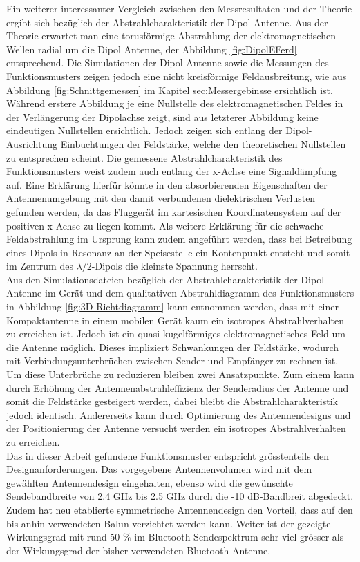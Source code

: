 Ein weiterer interessanter Vergleich zwischen den Messresultaten und der Theorie ergibt sich bezüglich der Abstrahlcharakteristik der Dipol Antenne. Aus der Theorie erwartet man eine torusförmige Abstrahlung der elektromagnetischen Wellen radial um die Dipol Antenne, der Abbildung \ref{fig:DipolEFerd} entsprechend. Die Simulationen der Dipol Antenne sowie die Messungen des Funktionsmusters zeigen jedoch eine nicht kreisförmige Feldausbreitung, wie aus Abbildung \ref{fig:Schnittgemessen} im Kapitel {sec:Messergebinsse} ersichtlich ist. Während erstere Abbildung je eine Nullstelle des elektromagnetischen Feldes in der Verlängerung der Dipolachse zeigt, sind aus letzterer Abbildung keine eindeutigen Nullstellen ersichtlich. Jedoch zeigen sich entlang der Dipol-Ausrichtung Einbuchtungen der Feldstärke, welche den theoretischen Nullstellen zu entsprechen scheint. Die gemessene Abstrahlcharakteristik des Funktionsmusters weist zudem auch entlang der x-Achse eine Signaldämpfung auf. Eine Erklärung hierfür könnte in den absorbierenden Eigenschaften der Antennenumgebung mit den damit verbundenen dielektrischen Verlusten gefunden werden, da das Fluggerät im kartesischen Koordinatensystem auf der positiven x-Achse zu liegen kommt. Als weitere Erklärung für die schwache Feldabstrahlung im Ursprung  kann zudem angeführt werden, dass bei Betreibung eines Dipols in Resonanz an der Speisestelle ein Kontenpunkt entsteht und somit im Zentrum des $\lambda/2$-Dipols die kleinste Spannung herrscht. \\
Aus den Simulationsdateien bezüglich der Abstrahlcharakteristik der Dipol Antenne  im Gerät und dem qualitativen Abstrahldiagramm des Funktionsmusters in Abbildung \ref{fig:3D Richtdiagramm} kann entnommen werden, dass mit einer Kompaktantenne in einem mobilen Gerät kaum ein isotropes Abstrahlverhalten zu erreichen ist. Jedoch ist ein quasi kugelförmiges elektromagnetisches Feld um die Antenne möglich. Dieses impliziert Schwankungen der Feldstärke, wodurch mit Verbindungsunterbrüchen zwischen Sender und Empfänger zu rechnen ist. Um diese Unterbrüche zu reduzieren bleiben zwei Ansatzpunkte. Zum einem kann durch Erhöhung der Antennenabstrahleffizienz der Senderadius der Antenne und somit die Feldstärke gesteigert werden, dabei bleibt die Abstrahlcharakteristik jedoch identisch. Andererseits kann durch Optimierung des Antennendesigns und der Positionierung der Antenne versucht werden ein isotropes Abstrahlverhalten zu erreichen. \\
Das in dieser Arbeit gefundene Funktionsmuster entspricht grösstenteils den Designanforderungen. Das vorgegebene Antennenvolumen wird mit dem gewählten Antennendesign eingehalten, ebenso wird die gewünschte Sendebandbreite von 2.4 GHz bis 2.5 GHz durch die -10 dB-Bandbreit abgedeckt. Zudem hat neu etablierte symmetrische Antennendesign den Vorteil, dass auf den bis anhin verwendeten Balun verzichtet  werden kann. Weiter ist der gezeigte Wirkungsgrad mit rund 50 $\%$ im Bluetooth Sendespektrum sehr viel grösser als der Wirkungsgrad der bisher verwendeten Bluetooth Antenne.\\
